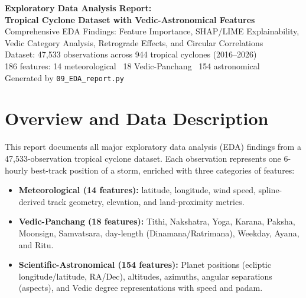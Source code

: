 \documentclass[11pt,a4paper]{article}
\begin{document}
\begin{titlepage}
  \centering
  \vspace*{2cm}
  {\Large\bfseries Exploratory Data Analysis Report:\\[0.4em]
   Tropical Cyclone Dataset with Vedic-Astronomical Features}\\[1.5cm]
  {\large Comprehensive EDA Findings: Feature Importance, SHAP/LIME Explainability,\\
   Vedic Category Analysis, Retrograde Effects, and Circular Correlations}\\[1.0cm]
  {\normalsize Dataset: 47,533 observations across 944 tropical cyclones (2016--2026)\\
   186 features: 14 meteorological \textbullet\
   18 Vedic-Panchang \textbullet\ 154 astronomical}\\[2cm]
  {\small Generated by \texttt{09\_EDA\_report.py}}
\end{titlepage}

\tableofcontents
\newpage

\section{Overview and Data Description}

This report documents all major exploratory data analysis (EDA) findings from a
47,533-observation tropical cyclone dataset. Each observation represents one
6-hourly best-track position of a storm, enriched with three categories of features:

\begin{itemize}[noitemsep]
  \item \textbf{Meteorological (14 features):} latitude, longitude, wind speed, spline-derived
        track geometry, elevation, and land-proximity metrics.
  \item \textbf{Vedic-Panchang (18 features):} Tithi, Nakshatra, Yoga, Karana, Paksha,
        Moonsign, Samvatsara, day-length (Dinamana/Ratrimana), Weekday, Ayana, and Ritu.
  \item \textbf{Scientific-Astronomical (154 features):} Planet positions (ecliptic
        longitude/latitude, RA/Dec), altitudes, azimuths, angular separations (aspects),
        and Vedic degree representations with speed and padam.
\end{itemize}
\end{document}
